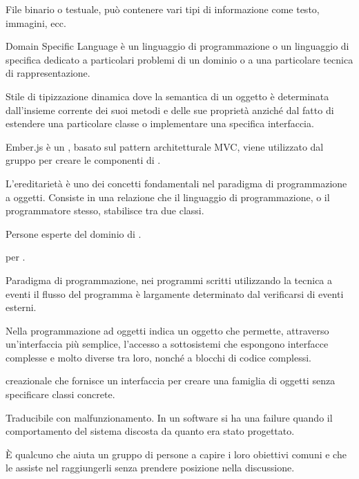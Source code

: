 File binario o testuale, può contenere vari tipi di informazione come testo, immagini, ecc.

Domain Specific Language è un linguaggio di programmazione o un linguaggio di specifica dedicato a particolari problemi di un dominio o a una particolare tecnica di rappresentazione.

Stile di tipizzazione dinamica dove la semantica di un oggetto è determinata dall'insieme corrente dei suoi metodi e delle sue proprietà anziché dal fatto di estendere una particolare classe o implementare una specifica interfaccia.


Ember.js è un   , basato sul pattern architetturale MVC, viene utilizzato dal gruppo per creare le componenti  di \ProjectName{}.

L'ereditarietà è uno dei concetti fondamentali nel paradigma di programmazione a oggetti. Consiste in una relazione che il linguaggio di programmazione, o il programmatore stesso, stabilisce tra due classi.

Persone esperte del dominio di .

 per .

Paradigma di programmazione, nei programmi scritti utilizzando la tecnica a eventi il flusso del programma è largamente determinato dal verificarsi di eventi esterni. 


Nella programmazione ad oggetti indica un oggetto che permette, attraverso un'interfaccia più semplice, l'accesso a sottosistemi che espongono interfacce complesse e molto diverse tra loro, nonché a blocchi di codice complessi.

 creazionale che fornisce un interfaccia per creare una famiglia di oggetti senza specificare classi concrete.

Traducibile con malfunzionamento. In un software si ha una failure quando il comportamento del sistema discosta da quanto era stato progettato.

È qualcuno che aiuta un gruppo di persone a capire i loro obiettivi comuni e che le assiste nel raggiungerli senza prendere posizione nella discussione.


